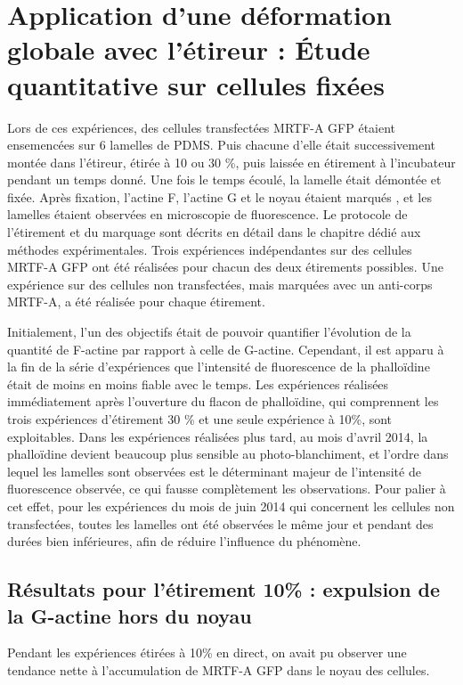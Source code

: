 \section{Application d'une déformation globale avec l'étireur : \'Etude quantitative sur cellules fixées}

Lors de ces expériences, des cellules transfectées MRTF-A GFP étaient ensemencées sur 6 lamelles de PDMS. Puis chacune d'elle était successivement montée dans l'étireur, étirée à 10 ou 30 \%, puis laissée en étirement à l'incubateur pendant un temps donné. Une fois le temps écoulé, la lamelle était démontée et fixée. Après fixation, l'actine F, l'actine G et le noyau étaient marqués , et les lamelles étaient observées en microscopie de fluorescence. Le protocole de l'étirement et du marquage sont décrits en détail dans le chapitre dédié aux méthodes expérimentales. 
Trois expériences indépendantes sur des cellules MRTF-A GFP ont été réalisées pour chacun des deux étirements possibles. Une expérience sur des cellules non transfectées, mais marquées avec un anti-corps MRTF-A, a été réalisée pour chaque étirement. 

Initialement, l'un des objectifs était de pouvoir quantifier l'évolution de la quantité de F-actine par rapport à celle de G-actine. Cependant, il est apparu à la fin de la série d'expériences que l'intensité de fluorescence de la phalloïdine était de moins en moins fiable avec le temps. Les expériences réalisées immédiatement après l'ouverture du flacon de phalloïdine, qui comprennent les trois expériences d'étirement 30 \% et une seule expérience à 10\%, sont exploitables. Dans les expériences réalisées plus tard, au mois d'avril 2014, la phalloïdine devient beaucoup plus sensible au photo-blanchiment, et l'ordre dans lequel les lamelles sont observées est le déterminant majeur de l'intensité de fluorescence observée, ce qui fausse complètement les observations. 
Pour palier à cet effet, pour les expériences du mois de juin 2014 qui concernent les cellules non transfectées, toutes les lamelles ont été observées le même jour et pendant des durées bien inférieures, afin de réduire l'influence du phénomène. 

\subsection{Résultats pour l'étirement 10\% : expulsion de la G-actine hors du noyau}

Pendant les expériences étirées à 10\% en direct, on avait pu observer une tendance nette à l'accumulation de MRTF-A GFP dans le noyau des cellules. 


